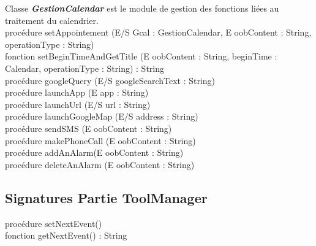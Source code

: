 \indent Classe \textbf{\emph{GestionCalendar}} est le module de gestion des fonctions liées au traitement du calendrier.\\

\indent procédure setAppointement (E/S Gcal : GestionCalendar, E oobContent : String, operationType : String)\\
\indent fonction setBeginTimeAndGetTitle (E oobContent : String, beginTime : Calendar, operationType : String) : String\\
\indent procédure googleQuery (E/S googleSearchText : String)\\
\indent procédure launchApp (E app : String)\\
\indent procédure launchUrl (E/S url : String)\\
\indent procédure launchGoogleMap (E/S address : String)\\
\indent procédure sendSMS (E oobContent : String)\\
\indent procédure makePhoneCall (E oobContent : String)\\
\indent procédure addAnAlarm(E oobContent : String)\\
\indent procédure deleteAnAlarm (E oobContent : String)\\

\subsection{Signatures Partie ToolManager}

\indent procédure setNextEvent()\\
\indent fonction getNextEvent() : String\\
\newpage

